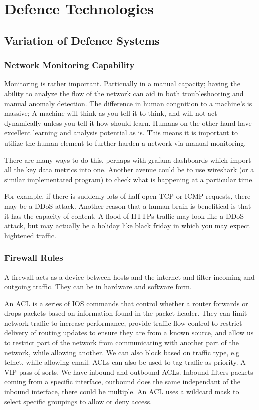 \chapter{Defence Technologies}
\section{Variation of Defence Systems}
\subsection{Network Monitoring Capability}
Monitoring is rather important. Particually in a manual capacity; having the ability to analyze the flow of the network can aid in both troubleshooting and manual anomaly detection. The difference in human congnition to a machine's is massive; A machine will think as you tell it to think,
and will not act dynamically unless you tell it how should learn. Humans on the other hand have excellent learning and analysis potential as is. This means it is important to utilize the human element to further harden a network via manual monitoring. 

There are many ways to do this, perhaps with grafana dashboards which import all the key data metrics into one. Another avenue could be to use wireshark (or a similar implementated program) to check what is happening at a particular time. 

For example, if there is suddenly lots of half open TCP or ICMP requests, there may be a DDoS attack. Another reason that a human brain is benefitical is that it has the capacity of content. A flood of HTTPs traffic may look like a DDoS attack, 
but may actually be a holiday like black friday in which you may expect hightened traffic.

\subsection{Firewall Rules}
A firewall acts as a device between hosts and the internet and filter incoming and outgoing traffic. They can be in hardware and software form.

An ACL is a series of IOS commands that control whether a router forwards or drops packets based on information found in the packet header. They can limit network traffic to increase performance, provide traffic flow control to restrict delivery of routing updates to 
ensure they are from a known source, and allow us to restrict part of the network from communicating with another part of the network, while allowing another. We can also block based on traffic type, e.g telnet, while allowing email. ACLs can also be used to tag traffic as priority. 
A VIP pass of sorts. We have inbound and outbound ACLs. Inbound filters packets coming from a specific interface, outbound does the same independant of the inbound interface, there could be multiple. An ACL uses a wildcard mask to select specific groupings to allow or deny access.

